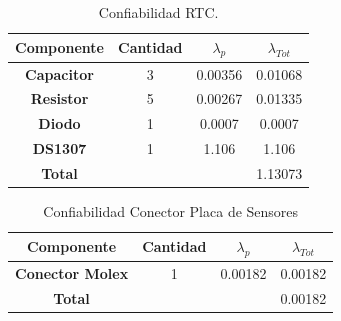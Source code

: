 \begin{table}[H]
\centering
\begin{tabular}{|c|ccc|}
\hline
\textbf{Componente} & \multicolumn{1}{c|}{\textbf{Cantidad}} & \multicolumn{1}{c|}{\textbf{$\lambda_p$}} & \textbf{$\lambda_{Tot}$} \\ \hline
\textbf{Capacitor}  & \multicolumn{1}{c|}{3}                 & \multicolumn{1}{c|}{0.00356}              & 0.01068                    \\ \hline
\textbf{Resistor}   & \multicolumn{1}{c|}{5}                 & \multicolumn{1}{c|}{0.00267}              & 0.01335                    \\ \hline
\textbf{Diodo}      & \multicolumn{1}{c|}{1}                 & \multicolumn{1}{c|}{0.0007}               & 0.0007                     \\ \hline
\textbf{DS1307}     & \multicolumn{1}{c|}{1}                 & \multicolumn{1}{c|}{1.106}                & 1.106                      \\ \hline
\textbf{Total}      &                                        &                                           & 1.13073                    \\ \hline
\end{tabular}
\caption{Confiabilidad RTC.}
\label{confRTC}
\end{table}
\begin{table}[H]
\centering
\begin{tabular}{|c|clc|}
\hline
\textbf{Componente}     & \multicolumn{1}{c|}{\textbf{Cantidad}} & \multicolumn{1}{c|}{\textbf{$\lambda_p$}} & \textbf{$\lambda_{Tot}$}   \\ \hline
\textbf{Conector Molex} & \multicolumn{1}{c|}{1}                 & \multicolumn{1}{r|}{0.00182}              & 0.00182                      \\ \hline
\textbf{Total}          & \multicolumn{1}{l}{}                   &                                           & \multicolumn{1}{r|}{0.00182} \\ \hline
\end{tabular}
\caption{Confiabilidad Conector Placa de Sensores}
\label{confsensores}
\end{table}
